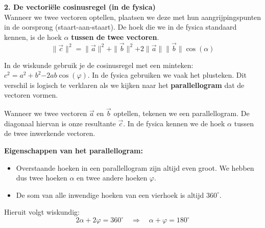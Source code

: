 \documentclass{ximera}
\begin{document}
\begin{remark}[foldable=true,title={Twee versies van de cosinusregel?}]
    \textbf{2. De vectoriële cosinusregel (in de fysica)} \\
    Wanneer we twee vectoren optellen, plaatsen we deze met hun aangrijpingspunten in de oorsprong (staart-aan-staart). De hoek die we in de fysica standaard kennen, is de hoek $\alpha$ \textbf{tussen de twee vectoren}. 
    \[ \|\vec{c}\|^2 = \|\vec{a}\|^2 + \|\vec{b}\|^2 \mathbf{+} 2\|\vec{a}\|\|\vec{b}\|\cos(\alpha) \]
    
    \begin{center}
        \captionsetup{width=0.85\textwidth}
    \end{center}

    \begin{hint}\nl
        In de wiskunde gebruik je de cosinusregel met een minteken: $c^2 = a^2 + b^2 \mathbf{-} 2ab\cos(\varphi)$. In de fysica gebruiken we vaak het plusteken. Dit verschil is logisch te verklaren als we kijken naar het \textbf{parallellogram} dat de vectoren vormen.

        Wanneer we twee vectoren $\vec{a}$ en $\vec{b}$ optellen, tekenen we een parallellogram. De diagonaal hiervan is onze resultante $\vec{c}$. In de fysica kennen we de hoek $\alpha$ tussen de twee inwerkende vectoren. 

        \textbf{Eigenschappen van het parallellogram:}
        \begin{itemize}
            \item Overstaande hoeken in een parallellogram zijn altijd even groot. We hebben dus twee hoeken $\alpha$ en twee andere hoeken $\varphi$.
            \item De som van alle inwendige hoeken van een vierhoek is altijd $360^\circ$.
        \end{itemize}
        Hieruit volgt wiskundig:
        \[ 2\alpha + 2\varphi = 360^\circ \quad \Longrightarrow \quad \alpha + \varphi = 180^\circ \]


\end{hint}
\end{remark}
\end{document}
